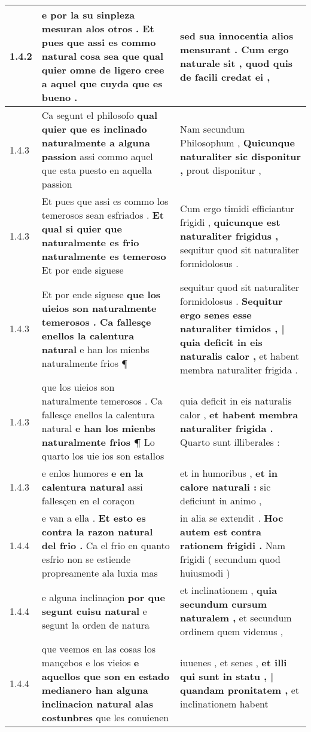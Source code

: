 \begin{tabular}{|p{1cm}|p{6.5cm}|p{6.5cm}|}
1.4.2 & e por la su sinpleza mesuran alos otros . \textbf{ Et pues que assi es commo natural cosa sea } que qual quier omne de ligero cree a aquel que cuyda que es bueno . & sed sua innocentia alios mensurant . \textbf{ Cum ergo naturale sit , } quod quis de facili credat ei , \\\hline
1.4.3 & Ca segunt el philosofo \textbf{ qual quier que es inclinado naturalmente a alguna passion } assi commo aquel que esta puesto en aquella passion & Nam secundum Philosophum , \textbf{ Quicunque naturaliter sic disponitur , } prout disponitur , \\\hline
1.4.3 & Et pues que assi es commo los temerosos sean esfriados . \textbf{ Et qual si quier que naturalmente es frio naturalmente es temeroso } Et por ende siguese & Cum ergo timidi efficiantur frigidi , \textbf{ quicunque est naturaliter frigidus , } sequitur quod sit naturaliter formidolosus . \\\hline
1.4.3 & Et por ende siguese \textbf{ que los uieios son naturalmente temerosos . Ca fallesçe enellos la calentura natural } e han los mienbs naturalmente frios ¶ & sequitur quod sit naturaliter formidolosus . \textbf{ Sequitur ergo senes esse naturaliter timidos , | quia deficit in eis naturalis calor , } et habent membra naturaliter frigida . \\\hline
1.4.3 & que los uieios son naturalmente temerosos . Ca fallesçe enellos la calentura natural \textbf{ e han los mienbs naturalmente frios ¶ } Lo quarto los uie ios son estallos & quia deficit in eis naturalis calor , \textbf{ et habent membra naturaliter frigida . } Quarto sunt illiberales : \\\hline
1.4.3 & e enlos humores \textbf{ e en la calentura natural } assi fallesçen en el coraçon & et in humoribus , \textbf{ et in calore naturali : } sic deficiunt in animo , \\\hline
1.4.4 & e van a ella . \textbf{ Et esto es contra la razon natural del frio . } Ca el frio en quanto esfrio non se estiende propreamente ala luxia mas & in alia se extendit . \textbf{ Hoc autem est contra rationem frigidi . } Nam frigidi ( secundum quod huiusmodi ) \\\hline
1.4.4 & e alguna inclinaçion \textbf{ por que segunt cuisu natural } e segunt la orden de natura & et inclinationem , \textbf{ quia secundum cursum naturalem , } et secundum ordinem quem videmus , \\\hline
1.4.4 & que veemos en las cosas los mançebos e los vieios \textbf{ e aquellos que son en estado medianero han alguna inclinacion natural alas costunbres } que les conuienen & iuuenes , et senes , \textbf{ et illi qui sunt in statu , | quandam pronitatem , } et inclinationem habent \\\hline

\end{tabular}
